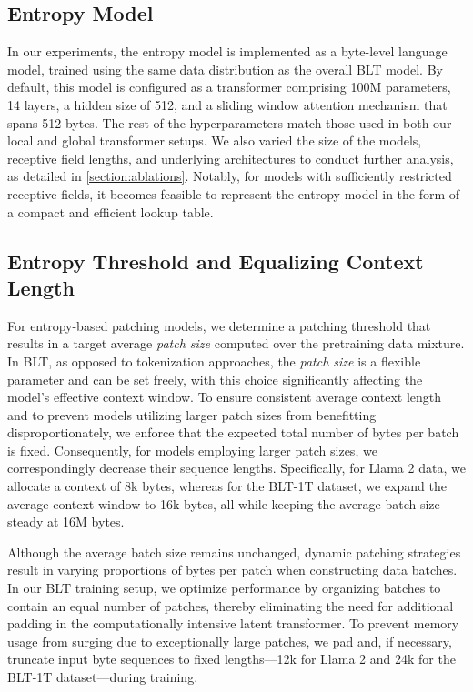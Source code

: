 \subsection{Entropy Model} In our experiments, the entropy model is implemented as a byte-level language model, trained using the same data distribution as the overall {\textsc BLT} model. By default, this model is configured as a transformer comprising 100M parameters, 14 layers, a hidden size of 512, and a sliding window attention mechanism that spans 512 bytes. The rest of the hyperparameters match those used in both our local and global transformer setups. We also varied the size of the models, receptive field lengths, and underlying architectures to conduct further analysis, as detailed in \autoref{section:ablations}. Notably, for models with sufficiently restricted receptive fields, it becomes feasible to represent the entropy model in the form of a compact and efficient lookup table.

\subsection{Entropy Threshold and Equalizing Context Length} For entropy-based patching models, we determine a patching threshold that results in a target average \textit{patch size} computed over the pretraining data mixture. In {\textsc BLT}, as opposed to tokenization approaches, the \textit{patch size} is a flexible parameter and can be set freely, with this choice significantly affecting the model's effective context window. To ensure consistent average context length and to prevent models utilizing larger patch sizes from benefitting disproportionately, we enforce that the expected total number of bytes per batch is fixed. Consequently, for models employing larger patch sizes, we correspondingly decrease their sequence lengths. Specifically, for Llama 2 data, we allocate a context of 8k bytes, whereas for the {\textsc BLT}-1T dataset, we expand the average context window to 16k bytes, all while keeping the average batch size steady at 16M bytes.

Although the average batch size remains unchanged, dynamic patching strategies result in varying proportions of bytes per patch when constructing data batches. In our {\textsc BLT} training setup, we optimize performance by organizing batches to contain an equal number of patches, thereby eliminating the need for additional padding in the computationally intensive latent transformer. To prevent memory usage from surging due to exceptionally large patches, we pad and, if necessary, truncate input byte sequences to fixed lengths—12k for Llama 2 and 24k for the {\textsc BLT}-1T dataset—during training.

